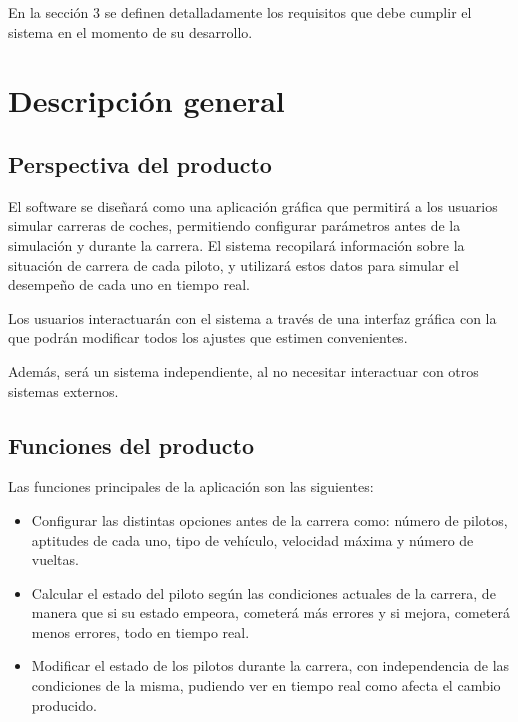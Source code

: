 En la sección 3 se definen detalladamente los requisitos que debe cumplir el sistema en el momento de su desarrollo.

\section{Descripción general}
\subsection{Perspectiva del producto}
El software se diseñará como una aplicación gráfica que permitirá a los usuarios simular carreras de coches, permitiendo configurar parámetros antes de la simulación y durante la carrera. El sistema recopilará información sobre la situación de carrera de cada piloto, y utilizará estos datos para simular el desempeño de cada uno en tiempo real.

\bigskip

Los usuarios interactuarán con el sistema a través de una interfaz gráfica con la que podrán modificar todos los ajustes que estimen convenientes.

\bigskip

Además, será un sistema independiente, al no necesitar interactuar con otros sistemas externos.

\subsection{Funciones del producto}

Las funciones principales de la aplicación son las siguientes:

\begin{itemize}
    \item 
    Configurar las distintas opciones antes de la carrera como: número de pilotos, aptitudes de cada uno, tipo de vehículo, velocidad máxima y número de vueltas. 
    
    \item Calcular el estado del piloto según las condiciones actuales de la carrera, de manera que si su estado empeora, cometerá más errores y si mejora, cometerá menos errores, todo en tiempo real.
    
    \item Modificar el estado de los pilotos durante la carrera, con independencia de las condiciones de la misma, pudiendo ver en tiempo real como afecta el cambio producido.
\end{itemize}


